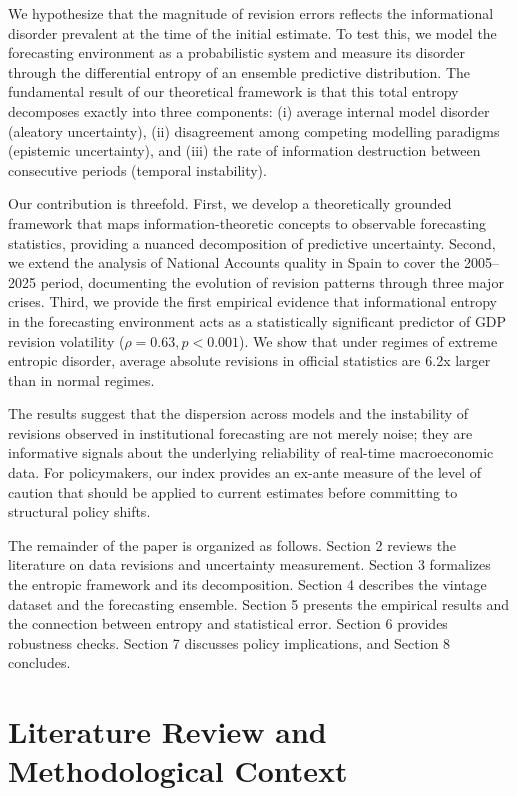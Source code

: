 \documentclass[12pt,a4paper]{article}
\theoremstyle{remark}
\begin{document}
We hypothesize that the magnitude of revision errors reflects the informational disorder prevalent at the time of the initial estimate. To test this, we model the forecasting environment as a probabilistic system and measure its disorder through the differential entropy of an ensemble predictive distribution. The fundamental result of our theoretical framework is that this total entropy decomposes exactly into three components: (i) average internal model disorder (aleatory uncertainty), (ii) disagreement among competing modelling paradigms (epistemic uncertainty), and (iii) the rate of information destruction between consecutive periods (temporal instability).

Our contribution is threefold. First, we develop a theoretically grounded framework that maps information-theoretic concepts to observable forecasting statistics, providing a nuanced decomposition of predictive uncertainty. Second, we extend the analysis of National Accounts quality in Spain \citep{pavia2018} to cover the 2005--2025 period, documenting the evolution of revision patterns through three major crises. Third, we provide the first empirical evidence that informational entropy in the forecasting environment acts as a statistically significant predictor of GDP revision volatility ($\rho = 0.63, p < 0.001$). We show that under regimes of extreme entropic disorder, average absolute revisions in official statistics are 6.2x larger than in normal regimes.

The results suggest that the dispersion across models and the instability of revisions observed in institutional forecasting are not merely noise; they are informative signals about the underlying reliability of real-time macroeconomic data. For policymakers, our index provides an ex-ante measure of the level of caution that should be applied to current estimates before committing to structural policy shifts.

The remainder of the paper is organized as follows. Section 2 reviews the literature on data revisions and uncertainty measurement. Section 3 formalizes the entropic framework and its decomposition. Section 4 describes the vintage dataset and the forecasting ensemble. Section 5 presents the empirical results and the connection between entropy and statistical error. Section 6 provides robustness checks. Section 7 discusses policy implications, and Section 8 concludes.

\section{Literature Review and Methodological Context}
\end{document}
